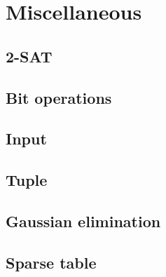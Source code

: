 \documentclass[a4paper, 11pt]{article}
\def\path{..}
\begin{document}
\clearpage
\section{Miscellaneous}
\subsection{2-SAT}


\clearpage
\subsection{Bit operations}


\subsection{Input}


\clearpage
\subsection{Tuple}


\clearpage
\subsection{Gaussian elimination}



\clearpage
\subsection{Sparse table}

\end{document}
